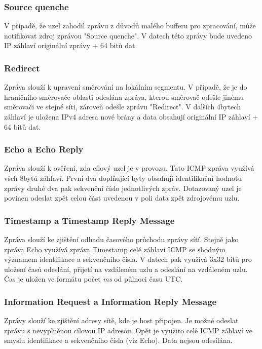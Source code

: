 \documentclass[12pt, a4paper]{article}
\begin{document}
\subsubsection{Source quenche}

V případě, že uzel zahodil zprávu z důvodů malého bufferu pro zpracování, může notifikovat zdroj zprávou "Source quenche". V datech této zprávy bude uvedeno IP záhlaví originální zprávy + 64 bitů dat.

\subsubsection{Redirect}

Zpráva slouží k upravení směrování na lokálním segmentu. V případě, že je do hraničního směrovače oblasti odeslána zpráva, kterou směrovač odešle jinému směrovači ve stejné síti, zároveň odešle zprávu "Redirect". V dalších 4bytech záhlaví je uložena IPv4 adresa nové brány a data obsahují originální IP záhlaví + 64 bitů dat. 

\subsubsection{Echo a Echo Reply}

Zpráva slouží k ověření, zda cílový uzel je v provozu. Tato ICMP zpráva využívá všch 8bytů záhlaví. První dva doplňující byty obsahují identifikační hodnotu zprávy druhé dva pak sekvenční číslo jednotlivých zpráv. Dotazovaný uzel je povinen odeslat zpět celou část uvedenou v poli data zpět zdrojovému uzlu.

\subsubsection{Timestamp a Timestamp Reply Message}

Zpráva slouží ke zjištění odhadu časového průchodu zprávy sítí. Stejně jako zpráva Echo využívá zpráva Timestamp celé záhlaví ICMP se shodným významem identifikace a sekvenčního čísla. V datech pak využívá 3x32 bitů pro uložení časů odeslání, přijetí na vzdáleném uzlu a odeslání na vzdáleném uzlu. Čas je uložen ve formátu počet \emph{ms} od půlnoci času UTC.

\subsubsection{Information Request a Information Reply Message}

Zprávy slouží ke zjištění adresy sítě, kde je host připojen. Je možné odeslat zprávu s nevyplněnou cílovou IP adresou. Opět je využito celé ICMP záhlaví ve smyslu identifikace a sekvenčního čísla (viz Echo). Data nejsou odesílána.
\end{document}
